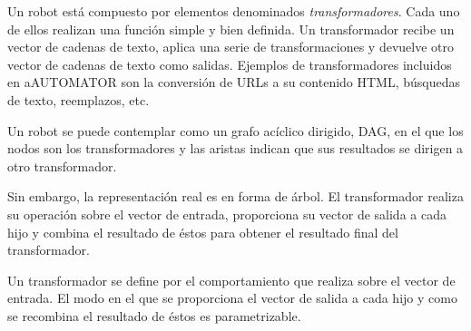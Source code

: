 Un robot está compuesto por elementos denominados
\emph{transformadores}. Cada uno de ellos realizan una función simple y bien
definida. Un transformador recibe un vector de cadenas de texto,
aplica una serie de transformaciones y devuelve otro vector de cadenas
de texto como salidas. Ejemplos de transformadores incluidos en
aAUTOMATOR son la conversión de URLs a su contenido HTML, búsquedas de
texto, reemplazos, etc.

Un robot se puede contemplar como un grafo acíclico dirigido,
DAG\cite{DAG}, en el que los nodos son los transformadores y las
aristas indican que sus resultados se dirigen a otro transformador.

Sin embargo, la representación real es en forma de árbol. El
transformador realiza su operación sobre el vector de entrada,
proporciona su vector de salida a cada hijo y combina el resultado de
éstos para obtener el resultado final del transformador.


Un transformador se define por el comportamiento que realiza sobre el
vector de entrada. El modo en el que se proporciona el vector de
salida a cada hijo y como se recombina el resultado de éstos es
parametrizable.

